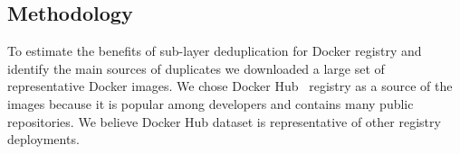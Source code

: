 \subsection{Methodology}
\label{sec:methodology}



%
%

To estimate the benefits of sub-layer deduplication for Docker registry and
identify the main sources of duplicates we downloaded a large set of
representative Docker images.
%
We chose Docker Hub~\cite{docker-hub} registry as a source of the images
because it is popular among developers and contains many public repositories.
%
We believe Docker Hub dataset is representative of other registry deployments.

